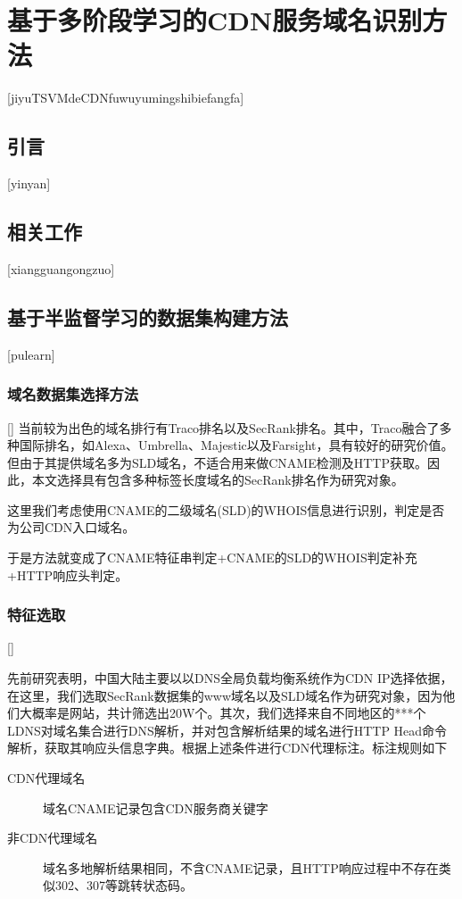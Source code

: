 
\chapter{基于多阶段学习的CDN服务域名识别方法}[jiyuTSVMdeCDNfuwuyumingshibiefangfa]




\section{引言}[yinyan]


\section{相关工作}[xiangguangongzuo]



\section{基于半监督学习的数据集构建方法}[pulearn]

\subsection{域名数据集选择方法}[]
当前较为出色的域名排行有Traco\cite{Pochat2018}排名以及SecRank\cite{Xie2022}排名。其中，Traco融合了多种国际排名，如Alexa、Umbrella、Majestic以及Farsight，具有较好的研究价值。但由于其提供域名多为SLD域名，不适合用来做CNAME检测及HTTP获取。因此，本文选择具有包含多种标签长度域名的SecRank排名作为研究对象。

这里我们考虑使用CNAME的二级域名(SLD)的WHOIS信息进行识别，判定是否为公司CDN入口域名。

于是方法就变成了CNAME特征串判定+CNAME的SLD的WHOIS判定补充+HTTP响应头判定。
\subsection{特征选取}[]

先前研究表明，中国大陆主要以以DNS全局负载均衡系统作为CDN IP选择依据，在这里，我们选取SecRank数据集的www域名以及SLD域名作为研究对象，因为他们大概率是网站，共计筛选出20W个。其次，我们选择来自不同地区的***个LDNS对域名集合进行DNS解析，并对包含解析结果的域名进行HTTP Head命令解析，获取其响应头信息字典。根据上述条件进行CDN代理标注。标注规则如下

\begin{description}
	\item[CDN代理域名] 域名CNAME记录包含CDN服务商关键字
	\item[非CDN代理域名] 域名多地解析结果相同，不含CNAME记录，且HTTP响应过程中不存在类似302、307等跳转状态码。
\end{description}

